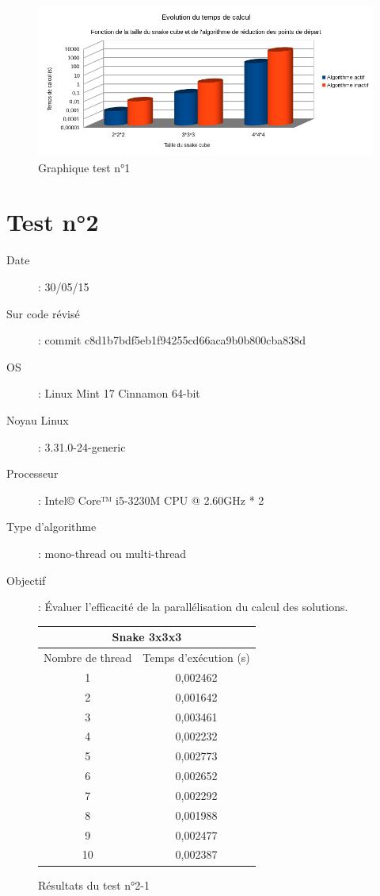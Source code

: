\begin{figure}[h]
 \centering
 \includegraphics[scale=0.6,keepaspectratio=true]{img/test1.png}
 \caption{Graphique test n°1}
\end{figure}

\newpage

\section{Test n°2}

\begin{description}
 \item[Date]: 30/05/15
 \item[Sur code révisé]: commit c8d1b7bdf5eb1f94255cd66aca9b0b800cba838d
 \item[OS]: Linux Mint 17 Cinnamon 64-bit
 \item[Noyau Linux]: 3.31.0-24-generic
 \item[Processeur]: Intel© Core™ i5-3230M CPU @ 2.60GHz * 2
 \item[Type d'algorithme]: mono-thread ou multi-thread
 \item[Objectif]: Évaluer l'efficacité de la parallélisation du calcul des solutions.
\end{description}

\begin{figure}[h]
\begin{center}
\begin{tabular}{|*{2}{c|}}
\hline
\multicolumn{2}{|c|}{Snake 3x3x3} \\
\hline
Nombre de thread & Temps d’exécution (s) \\
\hline
1 & 0,002462 \\
\hline
2 & 0,001642 \\
\hline
3 & 0,003461 \\
\hline
4 & 0,002232 \\
\hline
5 & 0,002773 \\
\hline
6 & 0,002652 \\
\hline
7 & 0,002292 \\
\hline
8 & 0,001988 \\
\hline
9 & 0,002477 \\
\hline
10 & 0,002387 \\
\hline
\end{tabular}
\end{center}
\caption{Résultats du test n°2-1}
\end{figure}

